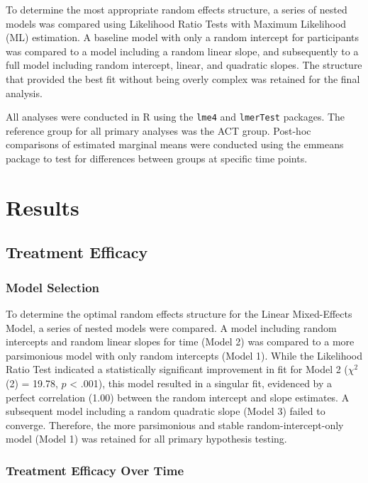 \documentclass[
  english,
  man]{apa6}
\begin{document}
To determine the most appropriate random effects structure, a series of nested models was compared using Likelihood Ratio Tests with Maximum Likelihood (ML) estimation. A baseline model with only a random intercept for participants was compared to a model including a random linear slope, and subsequently to a full model including random intercept, linear, and quadratic slopes. The structure that provided the best fit without being overly complex was retained for the final analysis.

All analyses were conducted in R using the \texttt{lme4} and \texttt{lmerTest} packages. The reference group for all primary analyses was the ACT group. Post-hoc comparisons of estimated marginal means were conducted using the emmeans package to test for differences between groups at specific time points.

\section{Results}\label{results}

\subsection{Treatment Efficacy}\label{treatment-efficacy-1}

\subsubsection{Model Selection}\label{model-selection}

To determine the optimal random effects structure for the Linear Mixed-Effects Model, a series of nested models were compared. A model including random intercepts and random linear slopes for time (Model 2) was compared to a more parsimonious model with only random intercepts (Model 1). While the Likelihood Ratio Test indicated a statistically significant improvement in fit for Model 2 (\(\chi^2\)(2) = 19.78, \(p\) \textless{} .001), this model resulted in a singular fit, evidenced by a perfect correlation (1.00) between the random intercept and slope estimates. A subsequent model including a random quadratic slope (Model 3) failed to converge. Therefore, the more parsimonious and stable random-intercept-only model (Model 1) was retained for all primary hypothesis testing.

\subsubsection{Treatment Efficacy Over Time}\label{treatment-efficacy-over-time}
\end{document}
